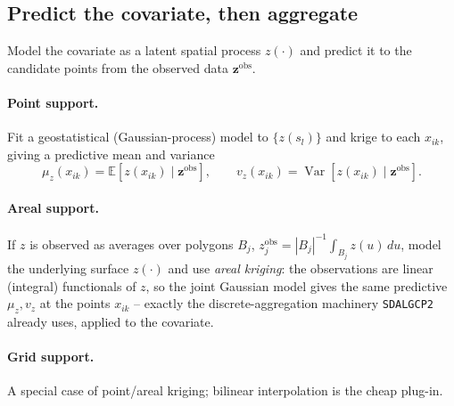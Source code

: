 \documentclass[11pt]{article}
\newcommand{\E}{\mathbb{E}}
\newcommand{\Var}{\operatorname{Var}}
\begin{document}
\subsection{Predict the covariate, then aggregate}
Model the covariate as a latent spatial process $z(\cdot)$ and predict it to the
candidate points from the observed data $\mathbf z^{\mathrm{obs}}$.

\paragraph{Point support.} Fit a geostatistical (Gaussian-process) model to
$\{z(s_l)\}$ and krige to each $x_{ik}$, giving a predictive mean and variance
\begin{equation}
\mu_z(x_{ik})=\E[z(x_{ik})\mid \mathbf z^{\mathrm{obs}}],
\qquad
v_z(x_{ik})=\Var[z(x_{ik})\mid \mathbf z^{\mathrm{obs}}].
\end{equation}

\paragraph{Areal support.} If $z$ is observed as averages over polygons $B_j$,
$z^{\mathrm{obs}}_j=|B_j|^{-1}\!\int_{B_j} z(u)\,du$, model the underlying surface
$z(\cdot)$ and use \emph{areal kriging}: the observations are linear (integral)
functionals of $z$, so the joint Gaussian model gives the same predictive
$\mu_z,v_z$ at the points $x_{ik}$ -- exactly the discrete-aggregation machinery
\texttt{SDALGCP2} already uses, applied to the covariate.

\paragraph{Grid support.} A special case of point/areal kriging; bilinear
interpolation is the cheap plug-in.
\end{document}
